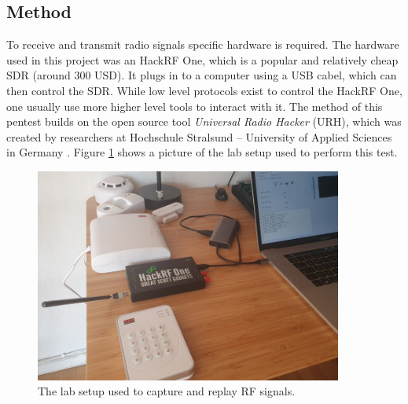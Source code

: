 \subsection{Method}
To receive and transmit radio signals specific hardware is required. The hardware used in this project was an HackRF One, which is a popular and relatively cheap \gls{SDR} (around 300 USD). It plugs in to a computer using a USB cabel, which can then control the SDR. While low level protocols exist to control the HackRF One, one usually use more higher level tools to interact with it. The method of this pentest builds on the open source tool \textit{Universal Radio Hacker} (URH), which was created by researchers at Hochschule Stralsund – University of Applied Sciences in Germany \cite{urh}. Figure \ref{fig:rf-lab-setup} shows a picture of the lab setup used to perform this test.
\begin{figure}[!ht]
    \centering
    \includegraphics[width=0.9\textwidth]{images/6-pentesting/lab-setup.png}
    \caption{The lab setup used to capture and replay RF signals.}
    \label{fig:rf-lab-setup}
\end{figure}


